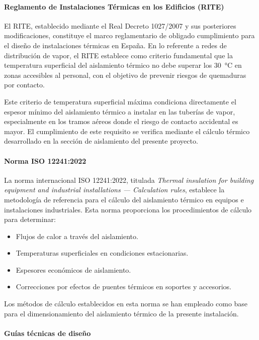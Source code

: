 \paragraph{Reglamento de Instalaciones Térmicas en los Edificios (RITE)}

El RITE, establecido mediante el Real Decreto 1027/2007 y sus posteriores modificaciones, constituye el marco reglamentario de obligado cumplimiento para el diseño de instalaciones térmicas en España. En lo referente a redes de distribución de vapor, el RITE establece como criterio fundamental que la temperatura superficial del aislamiento térmico no debe superar los 30~°C en zonas accesibles al personal, con el objetivo de prevenir riesgos de quemaduras por contacto.

Este criterio de temperatura superficial máxima condiciona directamente el espesor mínimo del aislamiento térmico a instalar en las tuberías de vapor, especialmente en los tramos aéreos donde el riesgo de contacto accidental es mayor. El cumplimiento de este requisito se verifica mediante el cálculo térmico desarrollado en la sección de aislamiento del presente proyecto.

\paragraph{Norma ISO 12241:2022}

La norma internacional ISO 12241:2022, titulada \textit{Thermal insulation for building equipment and industrial installations --- Calculation rules}, establece la metodología de referencia para el cálculo del aislamiento térmico en equipos e instalaciones industriales. Esta norma proporciona los procedimientos de cálculo para determinar:

\begin{itemize}[leftmargin=2em]
	\item Flujos de calor a través del aislamiento.
	\item Temperaturas superficiales en condiciones estacionarias.
	\item Espesores económicos de aislamiento.
	\item Correcciones por efectos de puentes térmicos en soportes y accesorios.
\end{itemize}

Los métodos de cálculo establecidos en esta norma se han empleado como base para el dimensionamiento del aislamiento térmico de la presente instalación.

\paragraph{Guías técnicas de diseño}

